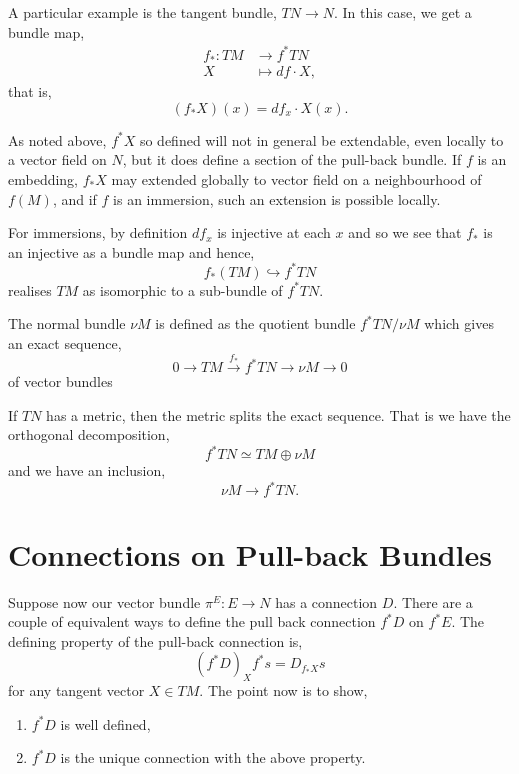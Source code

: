 \documentclass{amsart}
\begin{document}
\begin{example}
A particular example is the tangent bundle, \(TN \to N\). In this case, we get a bundle map,
\begin{align*}
f_{\ast} : TM &\to f^{\ast} TN \\
X &\mapsto df \cdot X,
\end{align*}
that is,
\[
(f_{\ast} X) (x) = df_{x} \cdot X(x).
\]

As noted above, \(f^{\ast} X\) so defined will not in general be extendable, even locally to a vector field on \(N\), but it does define a section of the pull-back bundle. If \(f\) is an embedding, \(f_{\ast} X\) may extended globally to vector field on a neighbourhood of \(f(M)\), and if \(f\) is an immersion, such an extension is possible locally.

For immersions, by definition \(df_x\) is injective at each \(x\) and so we see that \(f_{\ast}\) is an injective as a bundle map and hence,
\[
f_{\ast} (TM) \hookrightarrow f^{\ast} TN
\]
realises \(TM\) as isomorphic to a sub-bundle of \(f^{\ast} TN\).

The normal bundle \(\nu M\) is defined as the quotient bundle \(f^{\ast} TN/\nu M\) which gives an exact sequence,
\[
0 \to TM \overset{f_{\ast}}{\to} f^{\ast} TN \to \nu M \to 0
\]
of vector bundles

If \(TN\) has a metric, then the metric splits the exact sequence. That is we have the orthogonal decomposition,
\[
f^{\ast} TN \simeq TM \oplus \nu M
\]
and we have an inclusion,
\[
\nu M \to f^{\ast} TN.
\]
\end{example}

\section{Connections on Pull-back Bundles}

Suppose now our vector bundle \(\pi^E : E \to N\) has a connection \(D\). There are a couple of equivalent ways to define the pull back connection \(f^{\ast} D\) on \(f^{\ast} E\). The defining property of the pull-back connection is,
\[
(f^{\ast} D)_X f^{\ast} s = D_{f_{\ast} X} s
\]
for any tangent vector \(X \in TM\). The point now is to show,
\begin{enumerate}
\item \(f^{\ast} D\) is well defined,
\item \(f^{\ast} D\) is the unique connection with the above property.
\end{enumerate}
\end{document}
